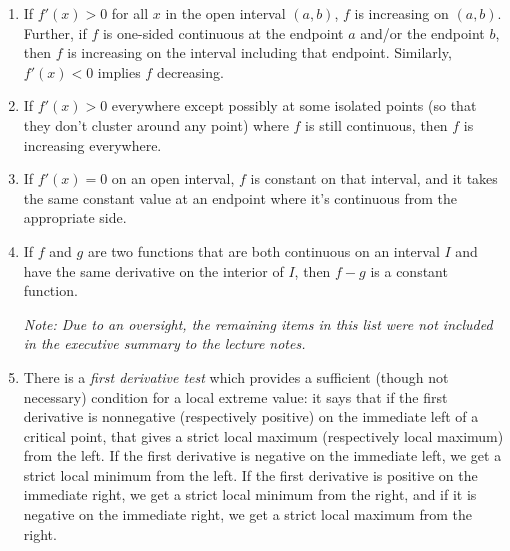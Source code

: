 \documentclass[10pt]{amsart}
\begin{document}
\begin{enumerate}
\item If $f'(x) > 0$ for all $x$ in the open interval $(a,b)$, $f$ is
  increasing on $(a,b)$. Further, if $f$ is one-sided continuous at
  the endpoint $a$ and/or the endpoint $b$, then $f$ is increasing on
  the interval including that endpoint. Similarly, $f'(x) < 0$ implies
  $f$ decreasing.
\item If $f'(x) > 0$ everywhere except possibly at some isolated
  points (so that they don't cluster around any point) where $f$ is
  still continuous, then $f$ is increasing everywhere.
\item If $f'(x) = 0$ on an open interval, $f$ is constant on that
  interval, and it takes the same constant value at an endpoint where
  it's continuous from the appropriate side.
\item If $f$ and $g$ are two functions that are both continuous on an
  interval $I$ and have the same derivative on the interior of $I$,
  then $f - g$ is a constant function.

  {\em Note: Due to an oversight, the remaining items in this list
  were not included in the executive summary to the lecture notes.}

\item There is a {\em first derivative test} which provides a
  sufficient (though not necessary) condition for a local extreme
  value: it says that if the first derivative is nonnegative
  (respectively positive) on the immediate left of a critical point,
  that gives a strict local maximum (respectively local maximum) from
  the left. If the first derivative is negative on the immediate left,
  we get a strict local minimum from the left. If the first derivative
  is positive on the immediate right, we get a strict local minimum
  from the right, and if it is negative on the immediate right, we get
  a strict local maximum from the right.


\end{enumerate}
\end{document}

